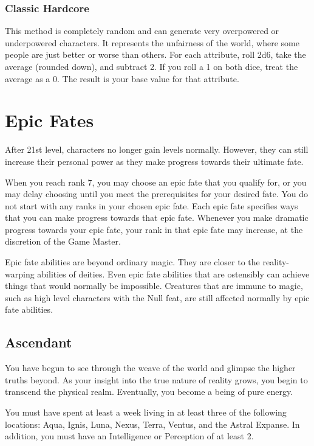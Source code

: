     \subsubsection{Classic Hardcore}

      This method is completely random and can generate very overpowered or underpowered characters.
      It represents the unfairness of the world, where some people are just better or worse than others.
      For each attribute, roll 2d6, take the average (rounded down), and subtract 2.
      If you roll a 1 on both dice, treat the average as a 0.
      The result is your base value for that attribute.

\section{Epic Fates}
  After 21st level, characters no longer gain levels normally.
  However, they can still increase their personal power as they make progress towards their ultimate fate.

  When you reach rank 7, you may choose an epic fate that you qualify for, or you may delay choosing until you meet the prerequisites for your desired fate.
  You do not start with any ranks in your chosen epic fate.
  Each epic fate specifies ways that you can make progress towards that epic fate.
  Whenever you make dramatic progress towards your epic fate, your rank in that epic fate may increase, at the discretion of the Game Master.

  Epic fate abilities are beyond ordinary magic.
  They are closer to the reality-warping abilities of deities.
  Even epic fate abilities that are ostensibly  can achieve things that would normally be impossible.
  Creatures that are immune to magic, such as high level characters with the Null feat, are still affected normally by \magical epic fate abilities.

  \subsection{Ascendant}
    You have begun to see through the weave of the world and glimpse the higher truths beyond.
    As your insight into the true nature of reality grows, you begin to transcend the physical realm.
    Eventually, you become a being of pure energy.

     You must have spent at least a week living in at least three of the following locations: Aqua, Ignis, Luna, Nexus, Terra, Ventus, and the Astral Expanse.
    In addition, you must have an Intelligence or Perception of at least 2.

